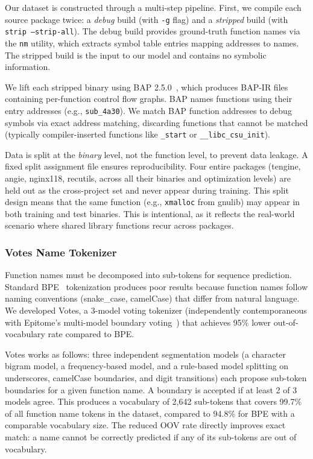 \documentclass[sigconf,nonacm]{acmart}
\begin{document}
Our dataset is constructed through a multi-step pipeline. First, we compile each source package twice: a \emph{debug} build (with \texttt{-g} flag) and a \emph{stripped} build (with \texttt{strip --strip-all}). The debug build provides ground-truth function names via the \texttt{nm} utility, which extracts symbol table entries mapping addresses to names. The stripped build is the input to our model and contains no symbolic information.

We lift each stripped binary using BAP 2.5.0~\cite{bap}, which produces BAP-IR files containing per-function control flow graphs. BAP names functions using their entry addresses (e.g., \texttt{sub\_4a30}). We match BAP function addresses to debug symbols via exact address matching, discarding functions that cannot be matched (typically compiler-inserted functions like \texttt{\_start} or \texttt{\_\_libc\_csu\_init}).

Data is split at the \emph{binary} level, not the function level, to prevent data leakage. A fixed split assignment file ensures reproducibility. Four entire packages (tengine, angie, nginx118, recutils, across all their binaries and optimization levels) are held out as the cross-project set and never appear during training. This split design means that the same function (e.g., \texttt{xmalloc} from gnulib) may appear in both training and test binaries. This is intentional, as it reflects the real-world scenario where shared library functions recur across packages.

\subsubsection{Votes Name Tokenizer}
\label{sec:votes}

Function names must be decomposed into sub-tokens for sequence prediction. Standard BPE~\cite{bpe} tokenization produces poor results because function names follow naming conventions (snake\_case, camelCase) that differ from natural language. We developed Votes, a 3-model voting tokenizer (independently contemporaneous with Epitome's multi-model boundary voting~\cite{epitome}) that achieves 95\% lower out-of-vocabulary rate compared to BPE.

Votes works as follows: three independent segmentation models (a character bigram model, a frequency-based model, and a rule-based model splitting on underscores, camelCase boundaries, and digit transitions) each propose sub-token boundaries for a given function name. A boundary is accepted if at least 2 of 3 models agree. This produces a vocabulary of 2,642 sub-tokens that covers 99.7\% of all function name tokens in the dataset, compared to 94.8\% for BPE with a comparable vocabulary size. The reduced OOV rate directly improves exact match: a name cannot be correctly predicted if any of its sub-tokens are out of vocabulary.
\end{document}
